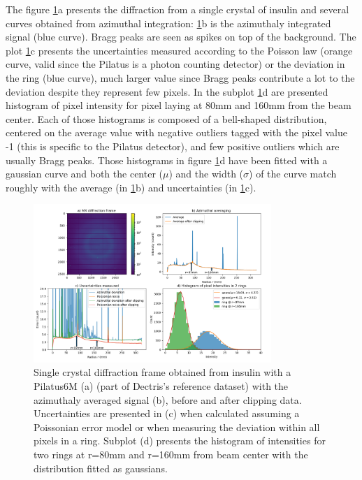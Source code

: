 \documentclass[preprint]{iucr}              %
\begin{document}
The figure \ref{fig1}a presents the diffraction from a single crystal of insulin and several curves obtained from azimuthal integration: 
\ref{fig1}b is the azimuthaly integrated signal (blue curve). Bragg peaks are seen as spikes on top of the background.
The plot \ref{fig1}c presents the uncertainties measured according to the Poisson law (orange curve, valid since the Pilatus is a photon counting detector) 
or the deviation in the ring (blue curve), much larger value since Bragg peaks contribute a lot to the deviation despite they represent few pixels.         
In the subplot \ref{fig1}d are presented histogram of pixel intensity for  pixel laying at 80mm and 160mm from the beam center. 
Each of those histograms is composed of a bell-shaped distribution, centered on the average value with negative outliers tagged with the pixel value -1
(this is specific to the Pilatus detector), and few positive outliers which are usually Bragg peaks.   
Those histograms in figure \ref{fig1}d have been fitted with a gaussian curve and both the center ($\mu$) and the width ($\sigma$) of the curve match 
roughly with the average (in \ref{fig1}b) and uncertainties (in \ref{fig1}c).  
\begin{figure}
\label{fig1}
\begin{center}
\includegraphics[width=9cm]{fig1}
\caption{Single crystal diffraction frame obtained from insulin with a Pilatus6M (a) (part of Dectris's reference dataset) with the azimuthaly averaged signal (b), 
before and after clipping data. Uncertainties are presented in (c) when calculated assuming a Poissonian error model or when measuring the deviation within all pixels in a ring.
Subplot (d) presents the histogram of intensities for two rings at r=80mm and r=160mm from beam center with the distribution fitted as gaussians.}
\end{center}
\end{figure}
\end{document}
